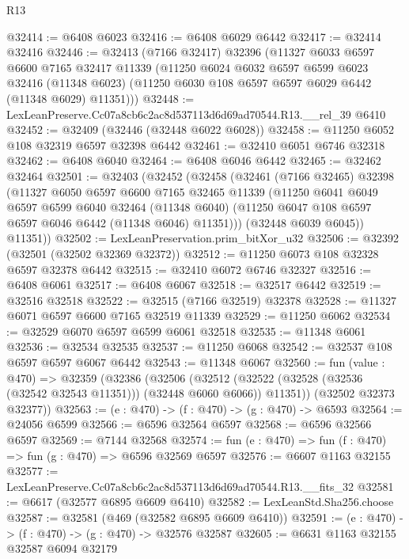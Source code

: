 \begin{lexlean}{R13}
\begin{coremodule}
@32414 := @6408 @6023
@32416 := @6408 @6029 @6442
@32417 := @32414 @32416
@32446 := @32413
    (@7166 @32417)
    @32396
    (@11327
      @6033
      @6597
      @6600
      @7165
      @32417
      @11339
      (@11250
        @6024
        @6032
        @6597
        @6599
        @6023
        @32416
        (@11348 @6023)
        (@11250 @6030 @108 @6597 @6597 @6029 @6442 (@11348 @6029) @11351)))
@32448 := LexLeanPreserve.Cc07a8cb6c2ac8d537113d6d69ad70544.R13.__rel_39 @6410
@32452 := @32409 (@32446 (@32448 @6022 @6028))
@32458 := @11250 @6052 @108 @32319 @6597 @32398 @6442
@32461 := @32410 @6051 @6746 @32318
@32462 := @6408 @6040
@32464 := @6408 @6046 @6442
@32465 := @32462 @32464
@32501 := @32403
    (@32452
      (@32458
        (@32461
          (@7166 @32465)
          @32398
          (@11327
            @6050
            @6597
            @6600
            @7165
            @32465
            @11339
            (@11250
              @6041
              @6049
              @6597
              @6599
              @6040
              @32464
              (@11348 @6040)
              (@11250 @6047 @108 @6597 @6597 @6046 @6442 (@11348 @6046) @11351)))
          (@32448 @6039 @6045))
        @11351))
@32502 := LexLeanPreservation.prim_bitXor_u32
@32506 := @32392 (@32501 (@32502 @32369 @32372))
@32512 := @11250 @6073 @108 @32328 @6597 @32378 @6442
@32515 := @32410 @6072 @6746 @32327
@32516 := @6408 @6061
@32517 := @6408 @6067
@32518 := @32517 @6442
@32519 := @32516 @32518
@32522 := @32515 (@7166 @32519) @32378
@32528 := @11327 @6071 @6597 @6600 @7165 @32519 @11339
@32529 := @11250 @6062
@32534 := @32529 @6070 @6597 @6599 @6061 @32518
@32535 := @11348 @6061
@32536 := @32534 @32535
@32537 := @11250 @6068
@32542 := @32537 @108 @6597 @6597 @6067 @6442
@32543 := @11348 @6067
@32560 := fun (value : @470) =>
  @32359
    (@32386
      (@32506
        (@32512 (@32522 (@32528 (@32536 (@32542 @32543 @11351))) (@32448 @6060 @6066)) @11351))
      (@32502 @32373 @32377))
@32563 := (e : @470) -> (f : @470) -> (g : @470) -> @6593
@32564 := @24056 @6599
@32566 := @6596 @32564 @6597
@32568 := @6596 @32566 @6597
@32569 := @7144 @32568
@32574 := fun (e : @470) => fun (f : @470) => fun (g : @470) => @6596 @32569 @6597
@32576 := @6607 @1163 @32155
@32577 := LexLeanPreserve.Cc07a8cb6c2ac8d537113d6d69ad70544.R13.__fits_32
@32581 := @6617 (@32577 @6895 @6609 @6410)
@32582 := LexLeanStd.Sha256.choose
@32587 := @32581 (@469 (@32582 @6895 @6609 @6410))
@32591 := (e : @470) -> (f : @470) -> (g : @470) -> @32576 @32587
@32605 := @6631
    @1163
    @32155
    @32587
    @6094
    @32179

\end{coremodule}
\end{lexlean}

